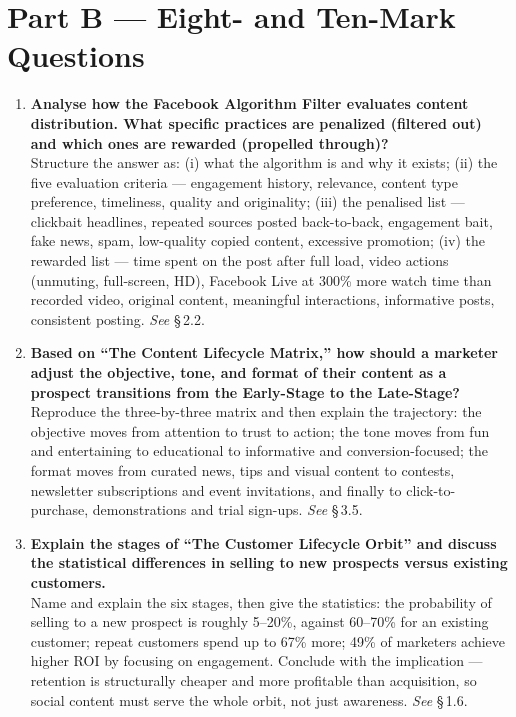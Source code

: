 \section*{Part B --- Eight- and Ten-Mark Questions}

\begin{enumerate}[leftmargin=2.2em,itemsep=1.4ex]

\item \textbf{Analyse how the Facebook Algorithm Filter evaluates content
      distribution. What specific practices are penalized (filtered out) and
      which ones are rewarded (propelled through)?}
      \\
      Structure the answer as: (i) what the algorithm is and why it exists;
      (ii) the five evaluation criteria --- engagement history, relevance,
      content type preference, timeliness, quality and originality; (iii) the
      penalised list --- clickbait headlines, repeated sources posted
      back-to-back, engagement bait, fake news, spam, low-quality copied
      content, excessive promotion; (iv) the rewarded list --- time spent on the
      post after full load, video actions (unmuting, full-screen, HD), Facebook
      Live at 300\% more watch time than recorded video, original content,
      meaningful interactions, informative posts, consistent posting.
      \hfill\emph{See} \S\,2.2.

\item \textbf{Based on ``The Content Lifecycle Matrix,'' how should a marketer
      adjust the objective, tone, and format of their content as a prospect
      transitions from the Early-Stage to the Late-Stage?}
      \\
      Reproduce the three-by-three matrix and then explain the trajectory: the
      objective moves from attention to trust to action; the tone moves from fun
      and entertaining to educational to informative and conversion-focused; the
      format moves from curated news, tips and visual content to contests,
      newsletter subscriptions and event invitations, and finally to
      click-to-purchase, demonstrations and trial sign-ups.
      \hfill\emph{See} \S\,3.5.

\item \textbf{Explain the stages of ``The Customer Lifecycle Orbit'' and discuss
      the statistical differences in selling to new prospects versus existing
      customers.} \\
      Name and explain the six stages, then give the statistics: the probability
      of selling to a new prospect is roughly 5--20\%, against 60--70\% for an
      existing customer; repeat customers spend up to 67\% more; 49\% of
      marketers achieve higher ROI by focusing on engagement. Conclude with the
      implication --- retention is structurally cheaper and more profitable than
      acquisition, so social content must serve the whole orbit, not just
      awareness. \hfill\emph{See} \S\,1.6.


\end{enumerate}
